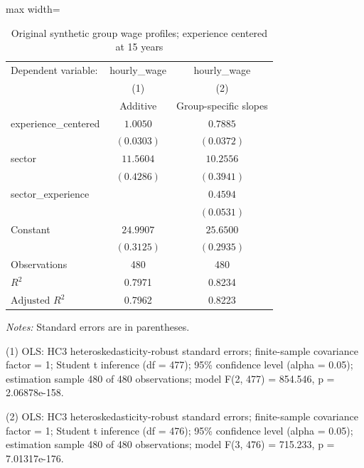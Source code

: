 \begin{table}[htbp]
\centering
\caption{Original synthetic group wage profiles; experience centered at 15 years}
\begingroup
\small
\setlength{\tabcolsep}{6pt}
\renewcommand{\arraystretch}{1.12}
\begin{adjustbox}{max width=\linewidth}
\begin{tabular}{@{}lcc@{}}
\toprule
Dependent variable: & hourly\_wage & hourly\_wage \\
 & (1) & (2) \\
 & Additive & Group-specific slopes \\
\midrule
experience\_centered & $1.0050$ & $0.7885$ \\
 & $(0.0303)$ & $(0.0372)$ \\[0.35em]
sector & $11.5604$ & $10.2556$ \\
 & $(0.4286)$ & $(0.3941)$ \\[0.35em]
sector\_experience &  & $0.4594$ \\
 &  & $(0.0531)$ \\[0.35em]
Constant & $24.9907$ & $25.6500$ \\
 & $(0.3125)$ & $(0.2935)$ \\[0.35em]
\midrule
Observations & 480 & 480 \\
$R^{2}$ & 0.7971 & 0.8234 \\
$\text{Adjusted }R^{2}$ & 0.7962 & 0.8223 \\
\bottomrule
\end{tabular}
\end{adjustbox}
\par\smallskip
\begin{minipage}{\linewidth}
\footnotesize
\raggedright
\textit{Notes:} Standard errors are in parentheses.\par
(1) OLS: HC3 heteroskedasticity-robust standard errors; finite-sample covariance factor = 1; Student t inference (df = 477); 95\% confidence level (alpha = 0.05); estimation sample 480 of 480 observations; model F(2, 477) = 854.546, p = 2.06878e-158.\par
(2) OLS: HC3 heteroskedasticity-robust standard errors; finite-sample covariance factor = 1; Student t inference (df = 476); 95\% confidence level (alpha = 0.05); estimation sample 480 of 480 observations; model F(3, 476) = 715.233, p = 7.01317e-176.\par
\end{minipage}
\endgroup
\end{table}